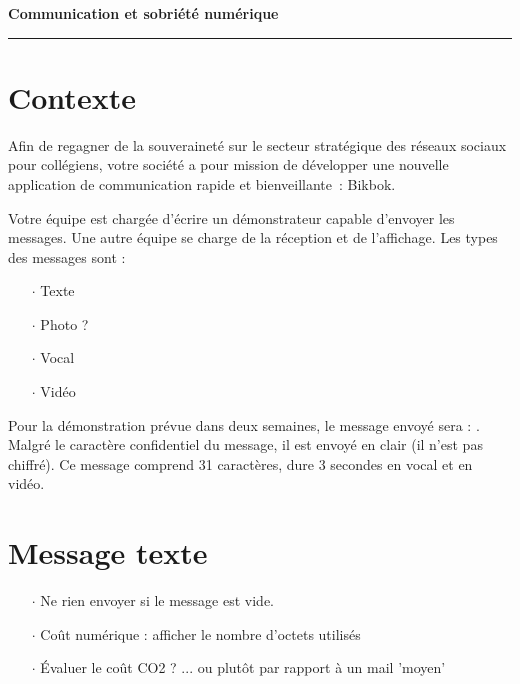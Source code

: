 \documentclass[a4paper]{article}
\begin{document}
\begin{center}
  \Large\bf Communication et sobriété numérique
\end{center}

\noindent\rule{\linewidth}{.6pt}

\section*{Contexte}

Afin de regagner de la souveraineté sur le secteur stratégique des réseaux sociaux pour collégiens, votre société a pour mission de développer une nouvelle application de communication rapide et bienveillante~: Bikbok.

Votre équipe est chargée d'écrire un démonstrateur capable d'envoyer les messages. Une autre équipe se charge de la réception et de l'affichage. Les types des messages sont :

\begin{itemize}[itemsep=0.2ex]
\item[$\cdot$] Texte
\item[$\cdot$] Photo ?
\item[$\cdot$] Vocal
\item[$\cdot$] Vidéo
\end{itemize}

Pour la démonstration prévue dans deux semaines, le message envoyé sera : . Malgré le caractère confidentiel du message, il  est envoyé en clair (il n'est pas chiffré). Ce message comprend 31 caractères, dure 3 secondes en vocal et en vidéo.

\section{Message texte}



\begin{itemize}[itemsep=0.2ex]
\item[$\cdot$] Ne rien envoyer si le message est vide.
\item[$\cdot$] Coût numérique : afficher le nombre d'octets utilisés
\item[$\cdot$] Évaluer le coût CO2 ? ... ou plutôt par rapport à un mail  'moyen'
\end{itemize}
\end{document}
